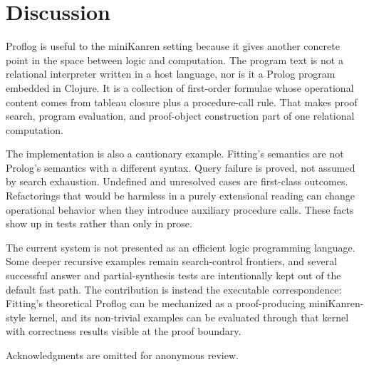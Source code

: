 \documentclass[acmsmall,screen,review,anonymous]{acmart}
\begin{document}
\section{Discussion}

Proflog is useful to the miniKanren setting because it gives another concrete
point in the space between logic and computation.  The program text is not a
relational interpreter written in a host language, nor is it a Prolog program
embedded in Clojure.  It is a collection of first-order formulae whose
operational content comes from tableau closure plus a procedure-call rule.  That
makes proof search, program evaluation, and proof-object construction part of
one relational computation.

The implementation is also a cautionary example.  Fitting's semantics are not
Prolog's semantics with a different syntax.  Query failure is proved, not
assumed by search exhaustion.  Undefined and unresolved cases are first-class
outcomes.  Refactorings that would be harmless in a purely extensional reading
can change operational behavior when they introduce auxiliary procedure calls.
These facts show up in tests rather than only in prose.

The current system is not presented as an efficient logic programming language.
Some deeper recursive examples remain search-control frontiers, and several
successful answer and partial-synthesis tests are intentionally kept out of the
default fast path.  The contribution is instead the executable correspondence:
Fitting's theoretical Proflog can be mechanized as a proof-producing
miniKanren-style kernel, and its non-trivial examples can be evaluated through
that kernel with correctness results visible at the proof boundary.

\begin{acks}
Acknowledgments are omitted for anonymous review.
\end{acks}




\end{document}
